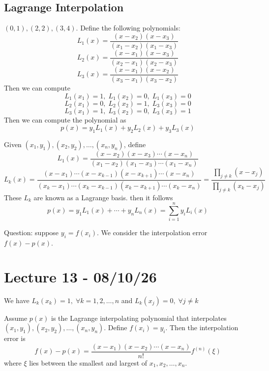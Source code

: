 \documentclass[11pt]{article}
\begin{document}
\subsection{Lagrange Interpolation}
\begin{example}
    $(0,1), (2,2), (3,4)$. Define the following polynomials:
    \[
        L_1(x) = \frac{(x-x_2)(x-x_3)}{(x_1-x_2)(x_1-x_3)}
    \]
    \[
        L_2(x) = \frac{(x-x_1)(x-x_3)}{(x_2-x_1)(x_2-x_3)}
    \]
    \[
        L_3(x) = \frac{(x-x_1)(x-x_2)}{(x_3-x_1)(x_3-x_2)}
    \]
    Then we can compute    
    \[
        L_1(x_1) = 1,\; L_1(x_2) = 0, \; L_1(x_3)=0
    \]
    \[
        L_2(x_1) = 0,\; L_2(x_2) = 1, \; L_3(x_3)=0
    \]
    \[
        L_3(x_1) = 1,\; L_3(x_2) = 0, \; L_3(x_3)=1
    \]    
    Then we can compute the polynomial as
    \[
        p(x) = y_1L_1(x) + y_2L_2(x)+y_3L_3(x)
    \]
    
\end{example}
\begin{definition}
Given $(x_1, y_1), (x_2, y_2), \dots, (x_n, y_n)$, define
\[
    L_1(x) = \frac{(x-x_2)(x-x_3)\cdots(x-x_n)}{(x_1-x_2)(x_1-x_3)\cdots(x_1-x_n)}
\]
\[
    L_k(x) =\frac{(x-x_1)\cdots(x-x_{k-1})(x-x_{k+1})\cdots (x-x_{n})}{(x_k-x_1)\cdots(x_k-x_{k-1})(x_k-x_{k+1})\cdots(x_k-x_n)} = \frac{\prod_{j \ne k } (x-x_j)}{\prod_{j \ne k}(x_k - x_j) }
\]
These $L_k$ are known as a Lagrange basis. then it follows
\[
    p(x) = y_1L_1(x) + \cdots + y_nL_n(x) = \sum_{i=1}^{n}y_iL_i(x) 
\]
\end{definition}
Question: suppose $y_i = f(x_i)$. We consider the interpolation error $f(x)-p(x)$.

\section{Lecture 13 - 08/10/26}
\begin{remark}
    We have $L_k(x_k) = 1, \; \forall k = 1, 2, \dots, n$ and $L_k(x_j) = 0, \; \forall  j\ne k$
\end{remark}

\begin{theorem}
    Assume $p(x)$ is the Lagrange interpolating polynomial that interpolates \\
    $(x_1, y_1), (x_2, y_2), \dots, (x_n, y_n)$. Define $f(x_i) = y_i$. Then the interpolation error is
    \[
        f(x)-p(x) = \frac{(x-x_1)(x-x_2)\cdots (x-x_n )}{n!}f^{(n)}(\xi)
    \]
    where $\xi$ lies between the smallest and largest of $x_1, x_2, \dots, x_n$.
\end{theorem}
\end{document}
